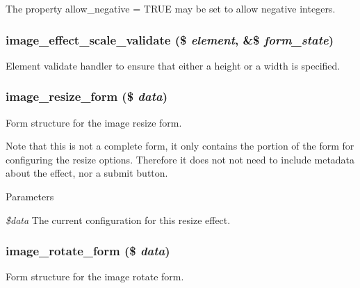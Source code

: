 The property allow\_\-negative = TRUE may be set to allow negative integers. \hypertarget{image_8admin_8inc_ae8049cc30ac262d165f3c1f73b657b0c}{
\subsubsection[{image\_\-effect\_\-scale\_\-validate}]{\setlength{\rightskip}{0pt plus 5cm}image\_\-effect\_\-scale\_\-validate (\$ {\em element}, \/  \&\$ {\em form\_\-state})}}
\label{image_8admin_8inc_ae8049cc30ac262d165f3c1f73b657b0c}
Element validate handler to ensure that either a height or a width is specified. \hypertarget{image_8admin_8inc_abe6ab1b2613696b2dc0914c0dc1c8031}{
\subsubsection[{image\_\-resize\_\-form}]{\setlength{\rightskip}{0pt plus 5cm}image\_\-resize\_\-form (\$ {\em data})}}
\label{image_8admin_8inc_abe6ab1b2613696b2dc0914c0dc1c8031}
Form structure for the image resize form.

Note that this is not a complete form, it only contains the portion of the form for configuring the resize options. Therefore it does not not need to include metadata about the effect, nor a submit button.


\begin{DoxyParams}{Parameters}
\item[{\em \$data}]The current configuration for this resize effect. \end{DoxyParams}
\hypertarget{image_8admin_8inc_a639fc7193d6ac3c7377e244beb2d114f}{
\subsubsection[{image\_\-rotate\_\-form}]{\setlength{\rightskip}{0pt plus 5cm}image\_\-rotate\_\-form (\$ {\em data})}}
\label{image_8admin_8inc_a639fc7193d6ac3c7377e244beb2d114f}
Form structure for the image rotate form.

